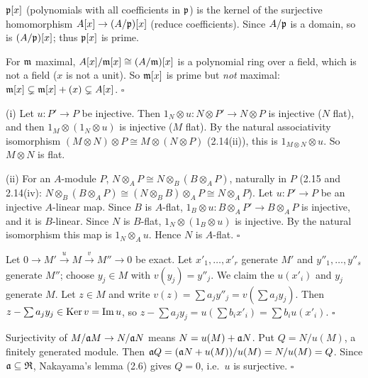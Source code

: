 \documentclass[11pt]{article}
\begin{document}
\pf
$\mathfrak p[x]$ (polynomials with all coefficients in $\mathfrak p$) is the kernel of the surjective homomorphism $A[x]\to(A/\mathfrak p)[x]$ (reduce coefficients). Since $A/\mathfrak p$ is a domain, so is $(A/\mathfrak p)[x]$; thus $\mathfrak p[x]$ is prime.

For $\mathfrak m$ maximal, $A[x]/\mathfrak m[x]\cong(A/\mathfrak m)[x]$ is a polynomial ring over a field, which is not a field ($x$ is not a unit). So $\mathfrak m[x]$ is prime but \emph{not} maximal: $\mathfrak m[x]\subsetneq\mathfrak m[x]+(x)\subsetneq A[x]$. \hfill$\square$

\pf
(i) Let $u:P'\to P$ be injective. Then $1_N\otimes u:N\otimes P'\to N\otimes P$ is injective ($N$ flat), and then $1_M\otimes(1_N\otimes u)$ is injective ($M$ flat). By the natural associativity isomorphism $(M\otimes N)\otimes P\cong M\otimes(N\otimes P)$ (2.14(ii)), this is $1_{M\otimes N}\otimes u$. So $M\otimes N$ is flat.

(ii) For an $A$-module $P$, $N\otimes_AP\cong N\otimes_B(B\otimes_AP)$, naturally in $P$ (2.15 and 2.14(iv): $N\otimes_B(B\otimes_AP)\cong(N\otimes_BB)\otimes_AP\cong N\otimes_AP$). Let $u:P'\to P$ be an injective $A$-linear map. Since $B$ is $A$-flat, $1_B\otimes u:B\otimes_AP'\to B\otimes_AP$ is injective, and it is $B$-linear. Since $N$ is $B$-flat, $1_N\otimes(1_B\otimes u)$ is injective. By the natural isomorphism this map is $1_N\otimes_Au$. Hence $N$ is $A$-flat. \hfill$\square$

\pf
Let $0\to M'\xrightarrow{u}M\xrightarrow{v}M''\to0$ be exact. Let $x'_1,\dots,x'_r$ generate $M'$ and $y''_1,\dots,y''_s$ generate $M''$; choose $y_j\in M$ with $v(y_j)=y''_j$. We claim the $u(x'_i)$ and $y_j$ generate $M$. Let $z\in M$ and write $v(z)=\sum a_jy''_j=v(\sum a_jy_j)$. Then $z-\sum a_jy_j\in\operatorname{Ker} v=\operatorname{Im}u$, so $z-\sum a_jy_j=u(\sum b_ix'_i)=\sum b_iu(x'_i)$. \hfill$\square$

\pf
Surjectivity of $M/\mathfrak a M\to N/\mathfrak a N$ means $N=u(M)+\mathfrak a N$. Put $Q=N/u(M)$, a finitely generated module. Then $\mathfrak a Q=(\mathfrak a N+u(M))/u(M)=N/u(M)=Q$. Since $\mathfrak a\subseteq\mathfrak R$, Nakayama's lemma (2.6) gives $Q=0$, i.e.\ $u$ is surjective. \hfill$\square$
\end{document}
